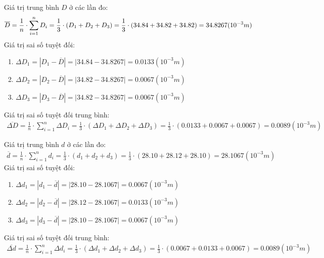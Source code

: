\documentclass{article}
\begin{document}
Giá trị trung bình $D$ ở các lần đo:
\begin{align*}
    \centering
    \overline{D} = \frac{1}{n}\cdot\sum_{i=1}^{n}D_i = \frac{1}{3}\cdot(D_1 + D_2 + D_3) = \frac{1}{3}\cdot(34.84 + 34.82 + 34.82) = 34.8267 (10^{-3} m)
\end{align*}
Giá trị sai số tuyệt đối: 
\begin{enumerate}
    \item $\Delta D_1 = |D_1 - \overline{D}| = |34.84 - 34.8267| = 0.0133 (10^{-3}m)$
    \item $\Delta D_2 = |D_2 - \overline{D}| = |34.82 - 34.8267| = 0.0067 (10^{-3}m)$
    \item $\Delta D_3 = |D_3 - \overline{D}| = |34.82 - 34.8267| = 0.0067 (10^{-3}m)$
\end{enumerate}
Giá trị sai số tuyệt đối trung bình:
\begin{align*}
    \overline{\Delta D} = \frac{1}{n}\cdot\sum_{i=1}^{n}\Delta D_i = \frac{1}{3}\cdot(\Delta D_1 + \Delta D_2 + \Delta D_3) = \frac{1}{3}\cdot(0.0133 + 0.0067 + 0.0067) = 0.0089 (10^{-3} m)
\end{align*}

Giá trị trung bình $d$ ở các lần đo:
\begin{align*}
    \overline{d} = \frac{1}{n}\cdot\sum_{i=1}^{n}d_i = \frac{1}{3}\cdot(d_1 + d_2 + d_3) = \frac{1}{3}\cdot(28.10 + 28.12 + 28.10) = 28.1067 (10^{-3} m)
\end{align*}
Giá trị sai số tuyệt đối:
\begin{enumerate}
    \item $\Delta d_1 = |d_1 - \overline{d}| = |28.10 - 28.1067| = 0.0067 (10^{-3}m)$
    \item $\Delta d_2 = |d_2 - \overline{d}| = |28.12 - 28.1067| = 0.0133 (10^{-3}m)$
    \item $\Delta d_3 = |d_3 - \overline{d}| = |28.10 - 28.1067| = 0.0067 (10^{-3}m)$
\end{enumerate}
Giá trị sai số tuyệt đối trung bình:
\begin{align*}
    \overline{\Delta d} = \frac{1}{n}\cdot\sum_{i=1}^{n}\Delta d_i = \frac{1}{3}\cdot(\Delta d_1 + \Delta d_2 + \Delta d_3) = \frac{1}{3}\cdot(0.0067+ 0.0133 + 0.0067) = 0.0089 (10^{-3} m)
\end{align*}
\end{document}
